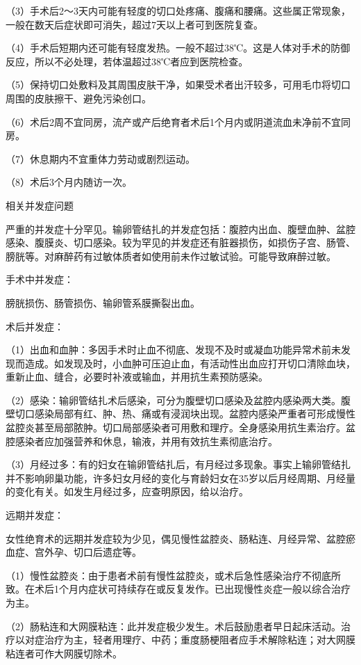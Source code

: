 \documentclass[12pt,UTF8]{ctexbook}
\begin{document}
（3）手术后2～3天内可能有轻度的切口处疼痛、腹痛和腰痛。这些属正常现象，一般在数天后症状即可消失，超过7天以上者可到医院复查。

（4）手术后短期内还可能有轻度发热。一般不超过38℃。这是人体对手术的防御反应，所以不必处理，若体温超过38℃者应到医院检查。

（5）保持切口处敷料及其周围皮肤干净，如果受术者出汗较多，可用毛巾将切口周围的皮肤擦干、避免污染创口。

（6）术后2周不宜同房，流产或产后绝育者术后1个月内或阴道流血未净前不宜同房。

（7）休息期内不宜重体力劳动或剧烈运动。

（8）术后3个月内随访一次。





相关并发症问题


严重的并发症十分罕见。输卵管结扎的并发症包括：腹腔内出血、腹壁血肿、盆腔感染、腹膜炎、切口感染。较为罕见的并发症还有脏器损伤，如损伤子宫、肠管、膀胱等。对麻醉药有过敏体质者如使用前未作过敏试验。可能导致麻醉过敏。

手术中并发症：

膀胱损伤、肠管损伤、输卵管系膜撕裂出血。

术后并发症：

（1）出血和血肿：多因手术时止血不彻底、发现不及时或凝血功能异常术前未发现而造成。如发现及时，小血肿可压迫止血，有活动性出血应打开切口清除血块，重新止血、缝合，必要时补液或输血，并用抗生素预防感染。

（2）感染：输卵管结扎术后感染，可分为腹壁切口感染及盆腔内感染两大类。腹壁切口感染局部有红、肿、热、痛或有浸润块出现。盆腔内感染严重者可形成慢性盆腔炎甚至局部脓肿。切口局部感染者可用敷和理疗。全身感染用抗生素治疗。盆腔感染者应加强营养和休息，输液，并用有效抗生素彻底治疗。

（3）月经过多：有的妇女在输卵管结扎后，有月经过多现象。事实上输卵管结扎并不影响卵巢功能，许多妇女月经的变化与育龄妇女在35岁以后月经周期、月经量的变化有关。如发生月经过多，应查明原因，给以治疗。

远期并发症：

女性绝育术的远期并发症较为少见，偶见慢性盆腔炎、肠粘连、月经异常、盆腔瘀血症、宫外孕、切口后遗症等。

（1）慢性盆腔炎：由于患者术前有慢性盆腔炎，或术后急性感染治疗不彻底所致。在术后1个月内症状可持续存在或反复发作。已出现慢性炎症一般以综合治疗为主。

（2）肠粘连和大网膜粘连：此并发症极少发生。术后鼓励患者早日起床活动。治疗以对症治疗为主，轻者用理疗、中药；重度肠梗阻者应手术解除粘连；对大网膜粘连者可作大网膜切除术。
\end{document}
